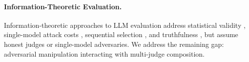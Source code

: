 \paragraph{Information-Theoretic Evaluation.}
Information-theoretic approaches to LLM evaluation address statistical validity \citep{robertson2025stepwise,feng2026noisy}, single-model attack costs \citep{kaneko2025bits}, sequential selection \citep{jung2026logarithmic}, and truthfulness \citep{chen2025incentivizing,qiu2026truthfulness}, but assume honest judges or single-model adversaries. We address the remaining gap: adversarial manipulation interacting with multi-judge composition.
